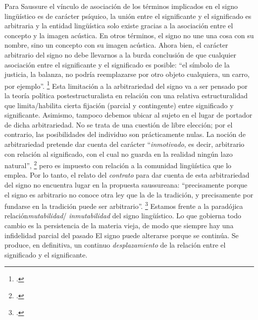 Para Saussure el vínculo de asociación de los términos implicados en el signo lingüístico es de carácter psíquico, la unión entre el significante y el significado es arbitraria y la entidad lingüística solo existe gracias a la asociación entre el concepto y la imagen acústica. En otros términos, el signo no une una cosa con su nombre, sino un concepto con su imagen acústica. Ahora bien, el carácter arbitrario del signo no debe llevarnos a la burda conclusión de que cualquier asociación entre el significante y el significado es posible: \enquote{el símbolo de la justicia, la balanza, no podría reemplazarse por otro objeto cualquiera, un carro, por ejemplo}. \footcite[][145]{@6996-SAUSSURE2007} Esta limitación a la arbitrariedad del signo va a ser pensado por la teoría política postestructuralista en relación con una relativa estructuralidad que limita/habilita cierta fijación (parcial y contingente) entre significado y significante. Asimismo, tampoco debemos ubicar al sujeto en el lugar de portador de dicha arbitrariedad. No se trata de una cuestión de libre elección; por el contrario, las posibilidades del individuo son prácticamente nulas. La noción de arbitrariedad pretende dar cuenta del carácter \enquote{\emph{inmotivado}, es decir, arbitrario con relación al significado, con el cual no guarda en la realidad ningún lazo natural}, \footcite[][146]{@6996-SAUSSURE2007} pero es impuesto con relación a la comunidad lingüística que lo emplea. Por lo tanto, el relato del \emph{contrato}  para dar cuenta de esta arbitrariedad del signo no encuentra lugar en la propuesta saussureana: \enquote{precisamente porque el signo es arbitrario no conoce otra ley que la de la tradición, y precisamente por fundarse en la tradición puede ser arbitrario}. \footcite[][153]{@6996-SAUSSURE2007} Estamos frente a la paradójica relación\emph{mutabilidad}/ \emph{inmutabilidad} del signo lingüístico. Lo que gobierna todo cambio es la persistencia de la materia vieja, de modo que siempre hay una infidelidad parcial del pasado El signo puede alterarse porque se continúa. Se produce, en definitiva, un continuo \emph{desplazamiento} de la relación entre el significado y el significante.

